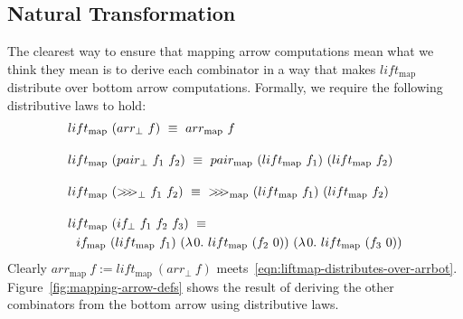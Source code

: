 \documentclass[preprint]{sigplanconf}
\newcommand{\arrowlift}{\ensuremath{lift}}
\newcommand{\arrowarr}{\ensuremath{arr}}
\newcommand{\arrowcomp}{\ensuremath{{>}\mspace{-6mu}{>}\mspace{-6mu}{>}}}
\newcommand{\arrowpair}{\ensuremath{pair}}
\newcommand{\arrowif}{\ensuremath{if}}
\newcommand{\arrbot}{\arrowarr_\bot}
\newcommand{\compbot}{\arrowcomp_\bot}
\newcommand{\pairbot}{\arrowpair_\bot}
\newcommand{\ifbot}{\arrowif_\bot}
\newcommand{\map}{_\mathrm{map}}
\newcommand{\liftmap}{\arrowlift\map}
\newcommand{\arrmap}{\arrowarr\map}
\newcommand{\compmap}{\arrowcomp\map}
\newcommand{\pairmap}{\arrowpair\map}
\newcommand{\ifmap}{\arrowif\map}
\begin{document}
\subsection{Natural Transformation}

The clearest way to ensure that mapping arrow computations mean what we think they mean is to derive each combinator in a way that makes $\liftmap$ distribute over bottom arrow computations. Formally, we require the following distributive laws to hold:
\begin{align}
	&\begin{aligned}
		\liftmap~(\arrbot~f) \ \equiv \ \arrmap~f
	\label{eqn:liftmap-distributes-over-arrbot}
	\end{aligned} \\
\nonumber \\[-6pt]
	&\begin{aligned}
		\liftmap~(\pairbot~f_1~f_2) \ \equiv \ \pairmap~(\liftmap~f_1)~(\liftmap~f_2)
	\label{eqn:liftmap-distributes-over-pairbot}
	\end{aligned} \\
\nonumber \\[-6pt]
	&\begin{aligned}
		\liftmap~(\compbot~f_1~f_2) \ \equiv \ \compmap~(\liftmap~f_1)~(\liftmap~f_2)
	\label{eqn:liftmap-distributes-over-compbot}
	\end{aligned} \\
\nonumber \\[-6pt]
	&\begin{aligned}
		&\liftmap~(\ifbot~f_1~f_2~f_3) \ \equiv \ \\
		&\ \ \ifmap~(\liftmap~f_1)~(\fun{0}{\liftmap~(f_2~0)})~(\fun{0}{\liftmap~(f_3~0)})
	\label{eqn:liftmap-distributes-over-ifbot}
	\end{aligned}
\end{align}
Clearly $\arrmap~f := \liftmap~(\arrbot~f)$ meets~\eqref{eqn:liftmap-distributes-over-arrbot}.
Figure~\ref{fig:mapping-arrow-defs} shows the result of deriving the other combinators from the bottom arrow using distributive laws.
\end{document}

